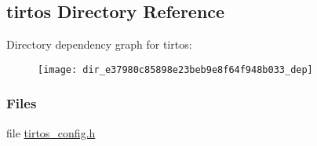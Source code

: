 \subsection{tirtos Directory Reference}
\label{dir_e37980c85898e23beb9e8f64f948b033}
Directory dependency graph for tirtos\+:
\nopagebreak
\begin{figure}[H]
\begin{center}
\leavevmode
\texttt{[image: dir\_e37980c85898e23beb9e8f64f948b033\_dep]}
\end{center}
\end{figure}
\subsubsection*{Files}
\begin{DoxyCompactItemize}
\item 
file \hyperlink{tirtos__config_8h}{tirtos\+\_\+config.\+h}
\end{DoxyCompactItemize}
